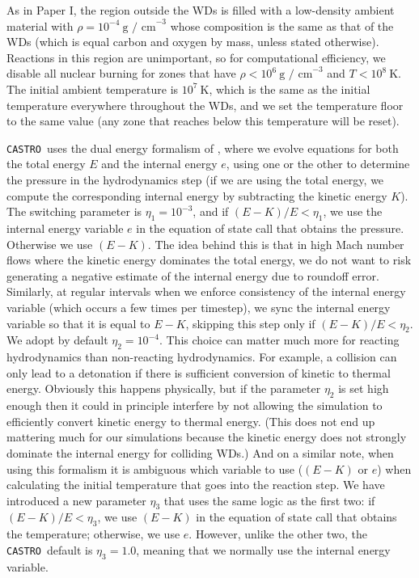 \documentclass[twocolumn,numberedappendix]{../aastex6}
\newcommand{\castro}{\texttt{CASTRO}}
\begin{document}
As in Paper I, the region outside the WDs is filled with a low-density ambient
material with $\rho = 10^{-4}\ \text{g / cm}^{-3}$ whose composition is the
same as that of the WDs (which is equal carbon and oxygen by mass, unless
stated otherwise). Reactions in this region are unimportant, so for
computational efficiency, we disable all nuclear burning for zones that have
$\rho < 10^6\ \text{g / cm}^{-3}$ and $T < 10^8\ \text{K}$. The initial ambient
temperature is $10^7\ \text{K}$, which is the same as the initial temperature
everywhere throughout the WDs, and we set the temperature floor to the same
value (any zone that reaches below this temperature will be reset).

\castro\ uses the dual energy formalism of \cite{bryan:1995,ENZO}, where we evolve equations
for both the total energy $E$ and the internal energy $e$, using one or the other to
determine the pressure in the hydrodynamics step (if we are using the total energy, we
compute the corresponding internal energy by subtracting the kinetic energy $K$). The switching
parameter is $\eta_1 = 10^{-3}$, and if $(E - K) / E < \eta_1$, we use the internal energy variable $e$
in the equation of state call that obtains the pressure. Otherwise we use $(E - K)$. The
idea behind this is that in high Mach number flows where the kinetic energy dominates the
total energy, we do not want to risk generating a negative estimate of the internal energy
due to roundoff error. Similarly, at regular intervals when we enforce consistency of the
internal energy variable (which occurs a few times per timestep), we sync the internal energy
variable so that it is equal to $E - K$, skipping this step only if $(E - K) / E < \eta_2$.
We adopt by default $\eta_2 = 10^{-4}$. This choice can matter much more for reacting
hydrodynamics than non-reacting hydrodynamics. For example, a collision can only lead to a
detonation if there is sufficient conversion of kinetic to thermal energy. Obviously
this happens physically, but if the parameter $\eta_2$ is set high enough then it could
in principle interfere by not allowing the simulation to efficiently convert kinetic energy
to thermal energy. (This does not end up mattering much for our simulations because the
kinetic energy does not strongly dominate the internal energy for colliding WDs.) And on
a similar note, when using this formalism it is ambiguous which variable to use ($(E - K)$
or $e$) when calculating the initial temperature that goes into the reaction step. We
have introduced a new parameter $\eta_3$ that uses the same logic as the first two: if
$(E - K) / E < \eta_3$, we use $(E - K)$ in the equation of state call that obtains the
temperature; otherwise, we use $e$. However, unlike the other two, the \castro\ default
is $\eta_3 = 1.0$, meaning that we normally use the internal energy variable.
\end{document}
